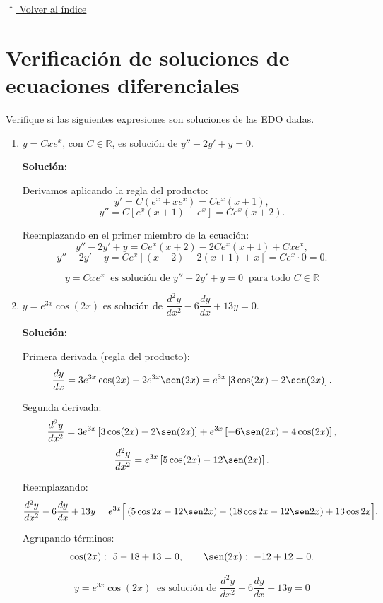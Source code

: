\documentclass[12pt]{article}
\newcommand{\solucion}{%
    \vspace{0.8em}%
    \textbf{Solución:}%
}
\newcommand{\volverindice}{%
    \vspace{1em}%
    \begin{flushright}%
        \hyperlink{indice}{\small $\uparrow$ Volver al índice}%
    \end{flushright}%
}
\begin{document}
\volverindice
\newpage


\section{Verificación de soluciones de ecuaciones diferenciales}

Verifique si las siguientes expresiones son soluciones de las EDO dadas.

\begin{enumerate}[label=\alph*.-]

    \item $y=Cxe^x$, con $C\in\mathbb{R}$, es solución de
    $y''-2y'+y=0$.

    \solucion

    Derivamos aplicando la regla del producto:
    \[
    y'=C\left(e^x+xe^x\right)=Ce^x(x+1),
    \]
    \[
    y''=C\left[e^x(x+1)+e^x\right]=Ce^x(x+2).
    \]

    Reemplazando en el primer miembro de la ecuación:
    \[
    y''-2y'+y
    =Ce^x(x+2)-2Ce^x(x+1)+Cxe^x,
    \]
    \[
    y''-2y'+y=Ce^x\left[(x+2)-2(x+1)+x\right]
    =Ce^x\cdot0=0.
    \]

    \[
    \boxed{
    y=Cxe^x\ \text{ es solución de } y''-2y'+y=0\ \text{ para todo } C\in\mathbb{R}
    }
    \]


    \item $y=e^{3x}\cos(2x)$ es solución de
    $\dfrac{d^2y}{dx^2}-6\dfrac{dy}{dx}+13y=0$.

    \solucion

    Primera derivada (regla del producto):
    \[
    \frac{dy}{dx}=3e^{3x}\cos(2x)-2e^{3x}\sen(2x)
    =e^{3x}\left[3\cos(2x)-2\sen(2x)\right].
    \]

    Segunda derivada:
    \[
    \frac{d^2y}{dx^2}
    =3e^{3x}\left[3\cos(2x)-2\sen(2x)\right]
    +e^{3x}\left[-6\sen(2x)-4\cos(2x)\right],
    \]
    \[
    \frac{d^2y}{dx^2}=e^{3x}\left[5\cos(2x)-12\sen(2x)\right].
    \]

    Reemplazando:
    \[
    \frac{d^2y}{dx^2}-6\frac{dy}{dx}+13y
    =e^{3x}\Big[\left(5\cos2x-12\sen2x\right)
    -\left(18\cos2x-12\sen2x\right)
    +13\cos2x\Big].
    \]

    Agrupando términos:
    \[
    \cos(2x):\ 5-18+13=0,
    \qquad
    \sen(2x):\ -12+12=0.
    \]

    \[
    \boxed{
    y=e^{3x}\cos(2x)\ \text{ es solución de }
    \frac{d^2y}{dx^2}-6\frac{dy}{dx}+13y=0
    }
    \]



\end{enumerate}
\end{document}
